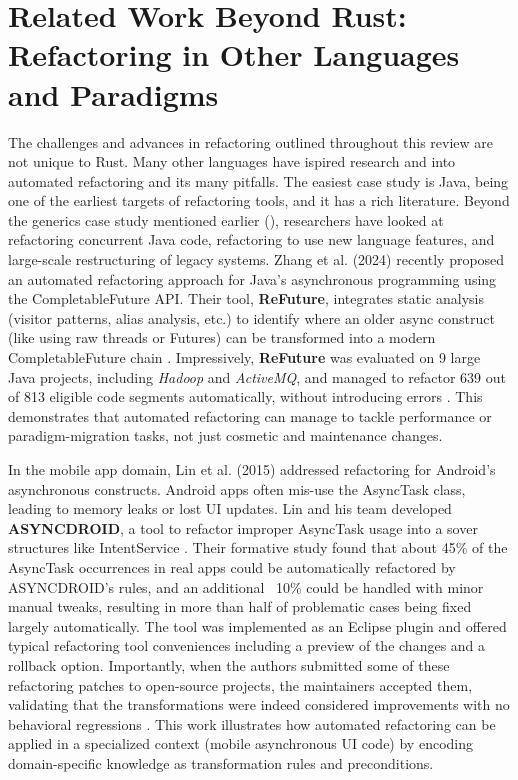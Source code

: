 \section{Related Work Beyond Rust: Refactoring in Other Languages and Paradigms}
\label{sec:related_work_beyond_rust}
The challenges and advances in refactoring outlined throughout this review are
not unique to Rust. Many other languages have ispired research and into
automated refactoring and its many pitfalls. The easiest case study is Java,
being one of the earliest targets of refactoring tools, and it has a rich
literature. Beyond the generics case study mentioned earlier
(\cite{GenericRefactoringJAVA}), researchers have looked at refactoring
concurrent Java code, refactoring to use new language features, and large-scale
restructuring of legacy systems. Zhang et al. (2024) recently proposed an
automated refactoring approach for Java's asynchronous programming using the
CompletableFuture API. Their tool, \textbf{ReFuture}, integrates static analysis
(visitor patterns, alias analysis, etc.) to identify where an older async
construct (like using raw threads or Futures) can be transformed into a modern
CompletableFuture chain \cite{AutomaticRefactoringAsyncJAVA}. Impressively,
\textbf{ReFuture} was evaluated on 9 large Java projects, including
\textit{Hadoop} and \textit{ActiveMQ}, and managed to refactor 639 out of 813
eligible code segments automatically, without introducing errors
\cite{AutomaticRefactoringAsyncJAVA}. This demonstrates that automated
refactoring can manage to tackle performance or paradigm-migration tasks, not just
cosmetic and maintenance changes.

In the mobile app domain, Lin et al. (2015) addressed refactoring for Android's
asynchronous constructs. Android apps often mis-use the AsyncTask class, leading
to memory leaks or lost UI updates. Lin and his team developed
\textbf{ASYNCDROID}, a tool to refactor improper AsyncTask usage into a sover
structures like IntentService \cite{AndroidAsncRefactoring}. Their formative
study found that about 45\% of the AsyncTask occurrences in real apps could be
automatically refactored by ASYNCDROID's rules, and an additional ~10\% could
be handled with minor manual tweaks, resulting in more than half of problematic
cases being fixed largely automatically. The tool was implemented as an Eclipse
plugin and offered typical refactoring tool conveniences including a preview of
the changes and a rollback option. Importantly, when the authors submitted some
of these refactoring patches to open-source projects, the maintainers accepted
them, validating that the transformations were indeed considered improvements
with no behavioral regressions \cite{AndroidAsncRefactoring}. This work
illustrates how automated refactoring can be applied in a specialized context
(mobile asynchronous UI code) by encoding domain-specific knowledge as
transformation rules and preconditions.

